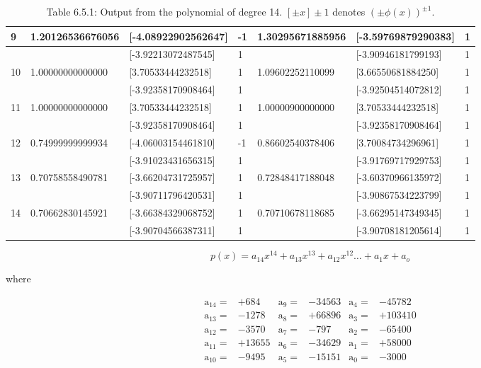 \documentclass[10pt]{article}
\begin{document}
\begin{table}[h]
\begin{center}
\begin{tabular}{|l|l|l|l|l|l|l|}
\hline
\multirow[t]{2}{*}{9} & \multirow[t]{2}{*}{1.20126536676056} & [-4.08922902562647] & -1 & 1.30295671885956 & [-3.59769879290383] & 1 \\
\hline
 &  & [-3.92213072487545] & 1 &  & [-3.90946181799193] & 1 \\
\hline
\multirow[t]{2}{*}{10} & \multirow[t]{2}{*}{1.00000000000000} & [3.70533444232518] & 1 & 1.09602252110099 & [3.66550681884250] & 1 \\
\hline
 &  & [-3.92358170908464] & 1 &  & [-3.92504514072812] & 1 \\
\hline
\multirow[t]{2}{*}{11} & \multirow[t]{2}{*}{1.00000000000000} & [3.70533444232518] & 1 & 1.00000900000000 & [3.70533444232518] & 1 \\
\hline
 &  & [-3.92358170908464] & 1 &  & [-3.92358170908464] & 1 \\
\hline
\multirow[t]{2}{*}{12} & \multirow[t]{2}{*}{0.74999999999934} & [-4.06003154461810] & -1 & 0.86602540378406 & [3.70084734296961] & 1 \\
\hline
 &  & [-3.91023431656315] & 1 &  & [-3.91769717929753] & 1 \\
\hline
\multirow[t]{2}{*}{13} & \multirow[t]{2}{*}{0.70758558490781} & [-3.66204731725957] & 1 & 0.72848417188048 & [-3.60370966135972] & 1 \\
\hline
 &  & [-3.90711796420531] & 1 &  & [-3.90867534223799] & 1 \\
\hline
\multirow[t]{2}{*}{14} & \multirow[t]{2}{*}{0.70662830145921} & [-3.66384329068752] & 1 & 0.70710678118685 & [-3.66295147349345] & 1 \\
\hline
 &  & [-3.90704566387311] & 1 &  & [-3.90708181205614] & 1 \\
\hline
\end{tabular}
\captionsetup{labelformat=empty}
\caption{Table 6.5.1: Output from the polynomial of degree 14. $[ \pm x] \pm 1$ denotes $( \pm \phi(x))^{ \pm 1}$.}
\end{center}
\end{table}

$$
p(x)=a_{14} x^{14}+a_{13} x^{13}+a_{12} x^{12} \ldots+a_{1} x+a_{o}
$$

where

$$
\begin{array}{lrlrlr}
\mathrm{a}_{14}= & +684 & \mathrm{a}_{9}= & -34563 & \mathrm{a}_{4}= & -45782 \\
\mathrm{a}_{13}= & -1278 & \mathrm{a}_{8}= & +66896 & \mathrm{a}_{3}= & +103410 \\
\mathrm{a}_{12}= & -3570 & \mathrm{a}_{7}= & -797 & \mathrm{a}_{2}= & -65400 \\
\mathrm{a}_{11}= & +13655 & \mathrm{a}_{6}= & -34629 & \mathrm{a}_{1}= & +58000 \\
\mathrm{a}_{10}= & -9495 & \mathrm{a}_{5}= & -15151 & \mathrm{a}_{0}= & -3000
\end{array}
$$
\end{document}
